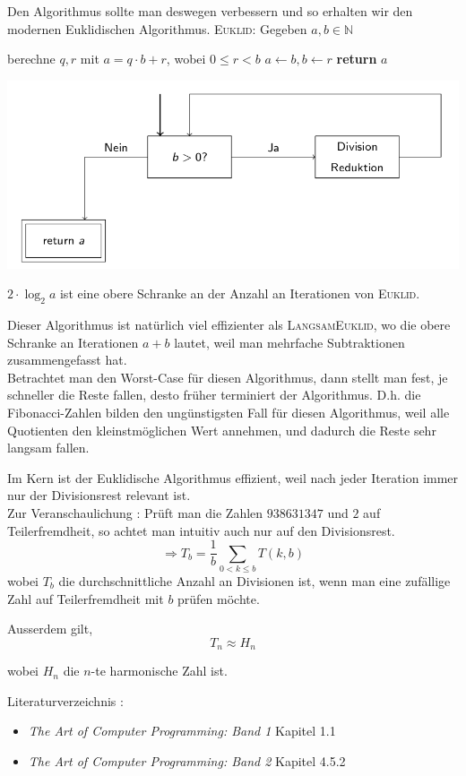 \documentclass {article}
\begin{document}
Den Algorithmus sollte man deswegen verbessern und so erhalten wir den modernen Euklidischen Algorithmus.
\newpage
	\textsc{Euklid}: Gegeben $a,b \in \mathbb{N}$
	 \begin{algorithmic}[1]
		\State berechne $q,r$ mit $a=q\cdot b+r$, wobei $0\leq r < b$
		\State $a\gets b, b\gets r$
		\EndWhile
		\State \textbf{return} $a$
	\end{algorithmic}	
	\begin{center}
	\includegraphics[scale=0.4]{euklid}
	\end{center}
	\vspace{10pt}
	$2\cdot \log_2{a}$ ist eine obere Schranke an der Anzahl an Iterationen von \textsc{Euklid}.
	
	Dieser Algorithmus ist nat\"urlich viel effizienter als \textsc{LangsamEuklid}, wo die obere Schranke an Iterationen $a+b$ lautet, weil man mehrfache Subtraktionen zusammengefasst hat.\\


Betrachtet man den Worst-Case f\"ur diesen Algorithmus, dann stellt man fest, je schneller die Reste fallen, desto fr\"uher terminiert der Algorithmus. D.h. die Fibonacci-Zahlen bilden den ung\"unstigsten Fall f\"ur diesen Algorithmus, weil alle Quotienten den kleinstm\"oglichen Wert annehmen, und dadurch die Reste sehr langsam fallen.

Im Kern ist der Euklidische Algorithmus effizient, weil nach jeder Iteration immer nur der Divisionsrest relevant ist.\\
Zur Veranschaulichung : Pr\"uft man die Zahlen $938631347$ und $2$ auf Teilerfremdheit, so achtet man intuitiv auch nur auf den Divisionsrest.
	$$\Rightarrow T_{b} = \frac{1}{b} \sum_{0 < k\leq b} T(k,b)$$ wobei $T_{b}$ die durchschnittliche Anzahl an Divisionen ist, wenn man eine zuf\"allige Zahl auf Teilerfremdheit mit $b$ pr\"ufen m\"ochte.

Ausserdem gilt,
	$$T_n \approx H_n$$
	\begin{flushright}
	wobei $H_n$ die $n$-te harmonische Zahl ist.	
	\end{flushright}	
\vspace*{10pt}
Literaturverzeichnis :
\begin{itemize}
\item \textit{The Art of Computer Programming: Band 1} Kapitel 1.1
\item \textit{The Art of Computer Programming: Band 2} Kapitel 4.5.2
\end{itemize}
\end{document}
